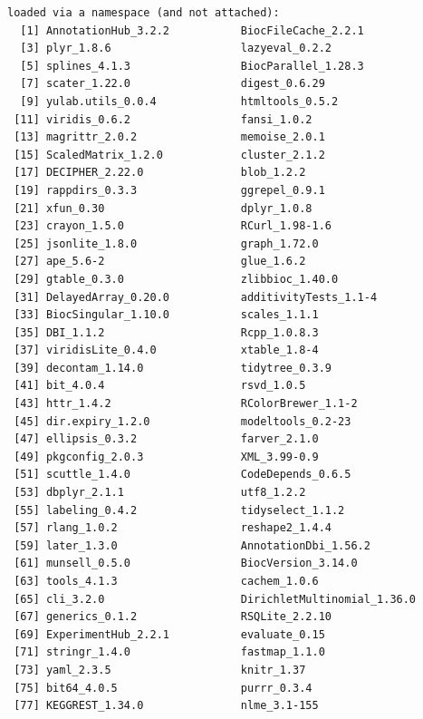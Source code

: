 \documentclass[
]{book}
\begin{document}
\begin{verbatim}
loaded via a namespace (and not attached):
  [1] AnnotationHub_3.2.2           BiocFileCache_2.2.1          
  [3] plyr_1.8.6                    lazyeval_0.2.2               
  [5] splines_4.1.3                 BiocParallel_1.28.3          
  [7] scater_1.22.0                 digest_0.6.29                
  [9] yulab.utils_0.0.4             htmltools_0.5.2              
 [11] viridis_0.6.2                 fansi_1.0.2                  
 [13] magrittr_2.0.2                memoise_2.0.1                
 [15] ScaledMatrix_1.2.0            cluster_2.1.2                
 [17] DECIPHER_2.22.0               blob_1.2.2                   
 [19] rappdirs_0.3.3                ggrepel_0.9.1                
 [21] xfun_0.30                     dplyr_1.0.8                  
 [23] crayon_1.5.0                  RCurl_1.98-1.6               
 [25] jsonlite_1.8.0                graph_1.72.0                 
 [27] ape_5.6-2                     glue_1.6.2                   
 [29] gtable_0.3.0                  zlibbioc_1.40.0              
 [31] DelayedArray_0.20.0           additivityTests_1.1-4        
 [33] BiocSingular_1.10.0           scales_1.1.1                 
 [35] DBI_1.1.2                     Rcpp_1.0.8.3                 
 [37] viridisLite_0.4.0             xtable_1.8-4                 
 [39] decontam_1.14.0               tidytree_0.3.9               
 [41] bit_4.0.4                     rsvd_1.0.5                   
 [43] httr_1.4.2                    RColorBrewer_1.1-2           
 [45] dir.expiry_1.2.0              modeltools_0.2-23            
 [47] ellipsis_0.3.2                farver_2.1.0                 
 [49] pkgconfig_2.0.3               XML_3.99-0.9                 
 [51] scuttle_1.4.0                 CodeDepends_0.6.5            
 [53] dbplyr_2.1.1                  utf8_1.2.2                   
 [55] labeling_0.4.2                tidyselect_1.1.2             
 [57] rlang_1.0.2                   reshape2_1.4.4               
 [59] later_1.3.0                   AnnotationDbi_1.56.2         
 [61] munsell_0.5.0                 BiocVersion_3.14.0           
 [63] tools_4.1.3                   cachem_1.0.6                 
 [65] cli_3.2.0                     DirichletMultinomial_1.36.0  
 [67] generics_0.1.2                RSQLite_2.2.10               
 [69] ExperimentHub_2.2.1           evaluate_0.15                
 [71] stringr_1.4.0                 fastmap_1.1.0                
 [73] yaml_2.3.5                    knitr_1.37                   
 [75] bit64_4.0.5                   purrr_0.3.4                  
 [77] KEGGREST_1.34.0               nlme_3.1-155                 

\end{verbatim}
\end{document}
